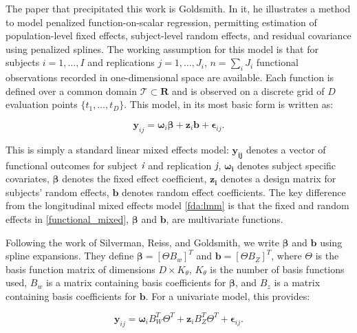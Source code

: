 The paper that precipitated this work is Goldsmith\cite{goldsmith_assessing_2016}.  
In it, he illustrates a method to model penalized function-on-scalar regression, 
permitting estimation of population-level fixed effects, subject-level random effects, and residual covariance using penalized splines.  
The working assumption for this model is that for subjects \(i=1,\dots, I\) and replications \(j=1,\dots, J_i\), \(n=\sum_i J_i\) 
functional observations recorded in one-dimensional space are available.  Each function is defined over a common domain 
\(\mathcal{T} \subset \mathbf{R}\) and is observed on a discrete grid of \(D\) evaluation points \(\{t_1, \dots, t_D\}\).  
This model, in its most basic form is written as:

\begin{equation}
\label{functional_mixed}
    \boldsymbol{y}_{ij} = \boldsymbol{\omega}_i\boldsymbol{\beta} + \boldsymbol{z}_{i}\boldsymbol{b} + \boldsymbol{\epsilon}_{ij}.
\end{equation}

\noindent
This is simply a standard linear mixed effects model: \(\boldsymbol{y_{ij}}\) denotes a vector of functional outcomes for subject 
\(\emph{i}\) and replication \(\emph{j}\), \(\boldsymbol{\omega_i}\) denotes subject specific covariates, \(\boldsymbol{\beta}\) 
denotes the fixed effect coefficient, \(\boldsymbol{z_i}\) denotes a design matrix for subjects' random effects, \(\boldsymbol{b}\) 
denotes random effect coefficients.  
The key difference from the longitudinal mixed effects model \eqref{fda:lmm} is that the fixed and random effects in 
\eqref{functional_mixed}, \(\boldsymbol{\beta}\) and \(\boldsymbol{b}\), are multivariate functions.

Following the work of Silverman\cite{ramsay_functional_2005}, Reiss\cite{reiss_fast_2010}, 
and Goldsmith\cite{goldsmith_assessing_2016}, we write \(\boldsymbol{\beta}\) and \(\boldsymbol{b}\) using spline expansions.  
They define $\boldsymbol{\beta} = \left[\Theta B_w\right]^T$ and $\boldsymbol{b} = \left[\Theta B_Z\right]^T$, where \(\Theta\) 
is the basis function matrix of dimensions \(D\times K_{\theta}\), \(K_\theta\) is the number of basis functions used, \(B_w\) 
is a matrix containing basis coefficients for \(\boldsymbol{\beta}\), and \(B_z\) is a matrix containing basis coefficients for 
\(\boldsymbol{b}\).  For a univariate model, this provides:

\begin{equation}
    \boldsymbol{y}_{ij} = \boldsymbol{\omega}_iB_W^T\Theta^T + \boldsymbol{z}_{i}B_Z^T\Theta^T + \boldsymbol{\epsilon}_{ij}.
\end{equation}

